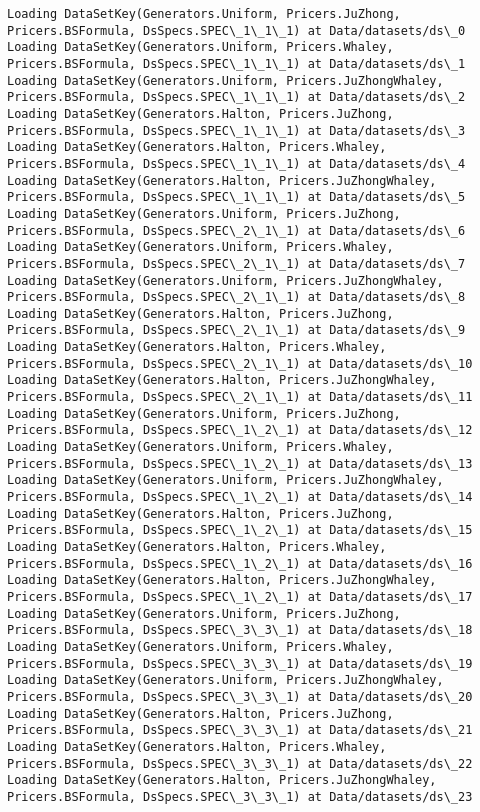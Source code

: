 \documentclass[11pt]{article}
\begin{document}
    \begin{Verbatim}[commandchars=\\\{\}]
Loading DataSetKey(Generators.Uniform, Pricers.JuZhong, Pricers.BSFormula, DsSpecs.SPEC\_1\_1\_1) at Data/datasets/ds\_0
Loading DataSetKey(Generators.Uniform, Pricers.Whaley, Pricers.BSFormula, DsSpecs.SPEC\_1\_1\_1) at Data/datasets/ds\_1
Loading DataSetKey(Generators.Uniform, Pricers.JuZhongWhaley, Pricers.BSFormula, DsSpecs.SPEC\_1\_1\_1) at Data/datasets/ds\_2
Loading DataSetKey(Generators.Halton, Pricers.JuZhong, Pricers.BSFormula, DsSpecs.SPEC\_1\_1\_1) at Data/datasets/ds\_3
Loading DataSetKey(Generators.Halton, Pricers.Whaley, Pricers.BSFormula, DsSpecs.SPEC\_1\_1\_1) at Data/datasets/ds\_4
Loading DataSetKey(Generators.Halton, Pricers.JuZhongWhaley, Pricers.BSFormula, DsSpecs.SPEC\_1\_1\_1) at Data/datasets/ds\_5
Loading DataSetKey(Generators.Uniform, Pricers.JuZhong, Pricers.BSFormula, DsSpecs.SPEC\_2\_1\_1) at Data/datasets/ds\_6
Loading DataSetKey(Generators.Uniform, Pricers.Whaley, Pricers.BSFormula, DsSpecs.SPEC\_2\_1\_1) at Data/datasets/ds\_7
Loading DataSetKey(Generators.Uniform, Pricers.JuZhongWhaley, Pricers.BSFormula, DsSpecs.SPEC\_2\_1\_1) at Data/datasets/ds\_8
Loading DataSetKey(Generators.Halton, Pricers.JuZhong, Pricers.BSFormula, DsSpecs.SPEC\_2\_1\_1) at Data/datasets/ds\_9
Loading DataSetKey(Generators.Halton, Pricers.Whaley, Pricers.BSFormula, DsSpecs.SPEC\_2\_1\_1) at Data/datasets/ds\_10
Loading DataSetKey(Generators.Halton, Pricers.JuZhongWhaley, Pricers.BSFormula, DsSpecs.SPEC\_2\_1\_1) at Data/datasets/ds\_11
Loading DataSetKey(Generators.Uniform, Pricers.JuZhong, Pricers.BSFormula, DsSpecs.SPEC\_1\_2\_1) at Data/datasets/ds\_12
Loading DataSetKey(Generators.Uniform, Pricers.Whaley, Pricers.BSFormula, DsSpecs.SPEC\_1\_2\_1) at Data/datasets/ds\_13
Loading DataSetKey(Generators.Uniform, Pricers.JuZhongWhaley, Pricers.BSFormula, DsSpecs.SPEC\_1\_2\_1) at Data/datasets/ds\_14
Loading DataSetKey(Generators.Halton, Pricers.JuZhong, Pricers.BSFormula, DsSpecs.SPEC\_1\_2\_1) at Data/datasets/ds\_15
Loading DataSetKey(Generators.Halton, Pricers.Whaley, Pricers.BSFormula, DsSpecs.SPEC\_1\_2\_1) at Data/datasets/ds\_16
Loading DataSetKey(Generators.Halton, Pricers.JuZhongWhaley, Pricers.BSFormula, DsSpecs.SPEC\_1\_2\_1) at Data/datasets/ds\_17
Loading DataSetKey(Generators.Uniform, Pricers.JuZhong, Pricers.BSFormula, DsSpecs.SPEC\_3\_3\_1) at Data/datasets/ds\_18
Loading DataSetKey(Generators.Uniform, Pricers.Whaley, Pricers.BSFormula, DsSpecs.SPEC\_3\_3\_1) at Data/datasets/ds\_19
Loading DataSetKey(Generators.Uniform, Pricers.JuZhongWhaley, Pricers.BSFormula, DsSpecs.SPEC\_3\_3\_1) at Data/datasets/ds\_20
Loading DataSetKey(Generators.Halton, Pricers.JuZhong, Pricers.BSFormula, DsSpecs.SPEC\_3\_3\_1) at Data/datasets/ds\_21
Loading DataSetKey(Generators.Halton, Pricers.Whaley, Pricers.BSFormula, DsSpecs.SPEC\_3\_3\_1) at Data/datasets/ds\_22
Loading DataSetKey(Generators.Halton, Pricers.JuZhongWhaley, Pricers.BSFormula, DsSpecs.SPEC\_3\_3\_1) at Data/datasets/ds\_23

    \end{Verbatim}
\end{document}
